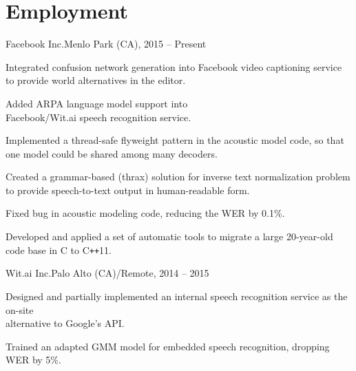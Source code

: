 \documentclass[11pt,a4paper]{article}
\begin{document}
\section{Employment}
\begin{multicols}{2}
  \raggedcolumns

  \begin{project1}{Facebook Inc.}{Menlo Park (CA), 2015 -- Present}
    \begin{items}
    \item Integrated confusion network generation into Facebook video
      captioning service to provide world alternatives in the editor.
    \item Added ARPA language model support into\\Facebook/Wit.ai speech
      recognition service.
    \item Implemented a thread-safe flyweight pattern in the acoustic model
      code, so that one model could be shared among many decoders.
    \item Created a grammar-based (thrax) solution for inverse text
      normalization problem to provide speech-to-text output in human-readable
      form.
    \item Fixed bug in acoustic modeling code, reducing the WER by 0.1\%.
    \item Developed and applied a set of automatic tools to migrate a large
      20-year-old code base in C to C\texttt{++}11.
    \end{items}
  \end{project1}

  \columnbreak

  \begin{project1}{Wit.ai Inc.}{Palo Alto (CA)/Remote, 2014 -- 2015}
    \begin{items}
    \item Designed and partially implemented an internal speech recognition
      service as the on-site\\alternative to Google's API.
    \item Trained an adapted GMM model for embedded speech recognition,
      dropping WER by 5\%.
    \end{items}
  \end{project1}


\end{multicols}
\end{document}
